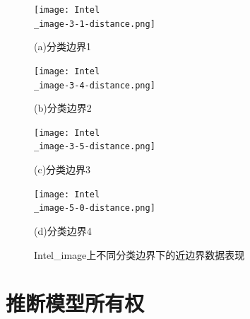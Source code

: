 \begin{figure}[htbp]%
	\centering
	\begin{minipage}[htbp]{0.49\linewidth}        %
		\hspace{2mm}
		\centering
		\texttt{[image: Intel\\\_image-3-1-distance.png]}
		\centerline{(a)分类边界1}
	\end{minipage}
	\begin{minipage}[htbp]{0.49\linewidth}        %
		\hspace{2mm}
		\centering
		\texttt{[image: Intel\\\_image-3-4-distance.png]}
		\centerline{(b)分类边界2}
	\end{minipage}
	\begin{minipage}[htbp]{0.49\linewidth}        %
		\hspace{2mm}
		\centering
		\texttt{[image: Intel\\\_image-3-5-distance.png]}
		\centerline{(c)分类边界3}
	\end{minipage}
	\begin{minipage}[htbp]{0.49\linewidth}        %
		\hspace{2mm}
		\centering
		\texttt{[image: Intel\\\_image-5-0-distance.png]}
		\centerline{(d)分类边界4}
	\end{minipage}
\setlength{\abovecaptionskip}{7mm} %
\caption{Intel\_image上不同分类边界下的近边界数据表现}
\label{Intel-image上不同分类边界下的近边界数据表现}
\end {figure}
	
\section{推断模型所有权}\label{5.4}

